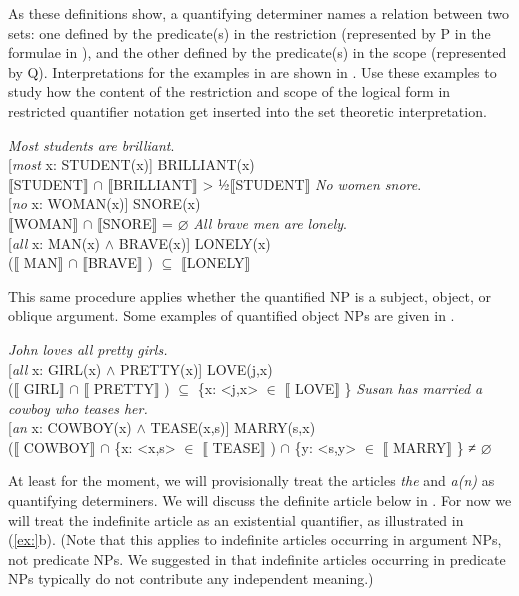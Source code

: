 As these definitions show, a quantifying determiner names a relation between two sets: one defined by the predicate(s) in the restriction (represented by P in the formulae in ), and the other defined by the predicate(s) in the scope (represented by Q). Interpretations for the examples in  are shown in . Use these examples to study how the content of the restriction and scope of the logical form in restricted quantifier notation get inserted into the set theoretic interpretation.


\ea
\ea  \textit{Most students are brilliant}.\\
{}[\textit{most} x: STUDENT(x)] BRILLIANT(x)\\
{\textbar} \textsc{$\llbracket$}STUDENT$\rrbracket$  ${\cap}$ \textsc{$\llbracket$}BRILLIANT$\rrbracket$  {\textbar}  >  ½\textsc{{\textbar}}\textsc{$\llbracket$}STUDENT$\rrbracket$ {\textbar}
\ex \textit{No women snore}.\\
{}[\textit{no} x: WOMAN(x)] SNORE(x)\\
\textsc{$\llbracket$}WOMAN$\rrbracket$  ${\cap}$ \textsc{$\llbracket$}SNORE$\rrbracket$  = ⌀
\ex   \textit{All brave men are lonely}.\\
{}[\textit{all} x: MAN(x) $\wedge$ BRAVE(x)] LONELY(x)\\
\textsc{($\llbracket$ }MAN$\rrbracket$  ${\cap}$ \textsc{$\llbracket$}BRAVE$\rrbracket$ )  ${\subseteq}$ \textsc{$\llbracket$}LONELY$\rrbracket$ 
\z \z


This same procedure applies whether the quantified NP is a subject, object, or oblique argument. Some examples of quantified object NPs are given in .


\ea
\ea \textit{John loves all pretty girls.}\\
{}[\textit{all} x: GIRL(x) $\wedge$ PRETTY(x)] LOVE(j,x)\\
($\llbracket$ GIRL$\rrbracket$  ${\cap}$ $\llbracket$ PRETTY$\rrbracket$ ) ${\subseteq}$ \{x: <j,x> ${\in}$ $\llbracket$ LOVE$\rrbracket$ \}
\ex \textit{Susan has married a cowboy who teases her.}\\
{}[\textit{an} x: COWBOY(x) $\wedge$ TEASE(x,s)] MARRY(s,x)\\
($\llbracket$ COWBOY$\rrbracket$  ${\cap}$ \{x: <x,s> ${\in}$ $\llbracket$ TEASE$\rrbracket$ ) ${\cap}$ \{y: <s,y> ${\in}$ $\llbracket$ MARRY$\rrbracket$ \} ≠ ⌀
\z \z


At least for the moment, we will provisionally treat the articles \textit{the} and \textit{a(n)} as quantifying determiners. We will discuss the definite article below in . For now we will treat the indefinite article as an existential quantifier, as illustrated in (\ref{ex:}b). (Note that this applies to indefinite articles occurring in argument NPs, not predicate NPs. We suggested in  that indefinite articles occurring in predicate NPs typically do not contribute any independent meaning.)




